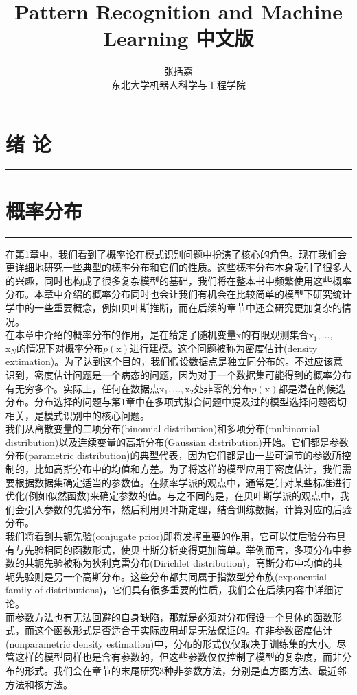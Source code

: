 \documentclass[b5paper]{book}
\author{张括嘉 \\ 东北大学机器人科学与工程学院}
\renewcommand {\thetable} {\thechapter{}.\arabic{table}}
\renewcommand {\thefigure} {\thechapter{}.\arabic{figure}}
\numberwithin{equation}{chapter}
\newcommand {\bx} {\boldsymbol{\mathrm{x}}}
\begin{document}
\title{Pattern Recognition and Machine Learning 中文版}
\date{}
	\chapter{绪 \quad 论}
	\noindent\rule[0.25\baselineskip]{\textwidth}{1pt}
	\renewcommand {\thetable} {\thechapter{}.\arabic{table}}
	\renewcommand {\thefigure} {\thechapter{}.\arabic{figure}}

	\chapter{概率分布}
	\noindent\rule[0.25\baselineskip]{\textwidth}{1pt}
	\renewcommand {\thetable} {\thechapter{}.\arabic{table}}
	\renewcommand {\thefigure} {\thechapter{}.\arabic{figure}}
	\textnormal{
	\indent 在第1章中，我们看到了概率论在模式识别问题中扮演了核心的角色。现在我们会更详细地研究一些典型的概率分布和它们的性质。这些概率分布本身吸引了很多人的兴趣，同时也构成了很多复杂模型的基础，我们将在整本书中频繁使用这些概率分布。本章中介绍的概率分布同时也会让我们有机会在比较简单的模型下研究统计学中的一些重要概念，例如贝叶斯推断，而在后续的章节中还会研究更加复杂的情况。\\
	\indent 在本章中介绍的概率分布的作用，是在给定了随机变量$\bx$的有限观测集合$\bx_1,...,$\\$\bx_N$的情况下对概率分布$p(\bx)$进行建模。这个问题被称为密度估计(density extimation)。为了达到这个目的，我们假设数据点是独立同分布的。不过应该意识到，密度估计问题是一个病态的问题，因为对于一个数据集可能得到的概率分布有无穷多个。实际上，任何在数据点$\bx_1,...,\bx_2$处非零的分布$p(\bx)$都是潜在的候选分布。分布选择的问题与第1章中在多项式拟合问题中提及过的模型选择问题密切相关，是模式识别中的核心问题。\\
	\indent 我们从离散变量的二项分布(binomial distribution)和多项分布(multinomial distribution)以及连续变量的高斯分布(Gaussian distribution)开始。它们都是参数分布(parametric distribution)的典型代表，因为它们都是由一些可调节的参数所控制的，比如高斯分布中的均值和方差。为了将这样的模型应用于密度估计，我们需要根据数据集确定适当的参数值。在频率学派的观点中，通常是针对某些标准进行优化(例如似然函数)来确定参数的值。与之不同的是，在贝叶斯学派的观点中，我们会引入参数的先验分布，然后利用贝叶斯定理，结合训练数据，计算对应的后验分布。\\
	\indent 我们将看到共轭先验(conjugate prior)即将发挥重要的作用，它可以使后验分布具有与先验相同的函数形式，使贝叶斯分析变得更加简单。举例而言，多项分布中参数的共轭先验被称为狄利克雷分布(Dirichlet distribution)，高斯分布中均值的共轭先验则是另一个高斯分布。这些分布都共同属于指数型分布族(exponential family of distributions)，它们具有很多重要的性质，我们会在后续内容中详细讨论。\\
	\indent 而参数方法也有无法回避的自身缺陷，那就是必须对分布假设一个具体的函数形式，而这个函数形式是否适合于实际应用却是无法保证的。在非参数密度估计(nonparametric density estimation)中，分布的形式仅仅取决于训练集的大小。尽管这样的模型同样也是含有参数的，但这些参数仅仅控制了模型的复杂度，而非分布的形式。我们会在章节的末尾研究3种非参数方法，分别是直方图方法、最近邻方法和核方法。
	}
\end{document}
